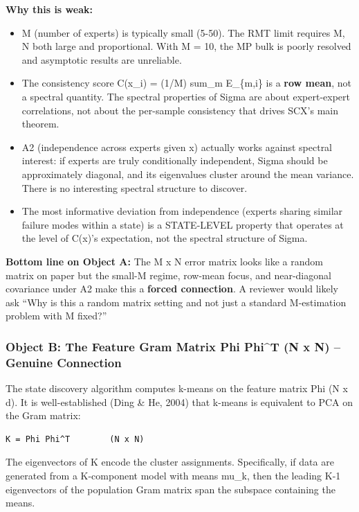 \documentclass[
  12pt,
]{article}
\providecommand{\tightlist}{%
  \setlength{\itemsep}{0pt}\setlength{\parskip}{0pt}}
\begin{document}
\textbf{Why this is weak:}

\begin{itemize}
\tightlist
\item
  M (number of experts) is typically small (5-50). The RMT limit
  requires M, N both large and proportional. With M = 10, the MP bulk is
  poorly resolved and asymptotic results are unreliable.
\item
  The consistency score C(x\_i) = (1/M) sum\_m E\_\{m,i\} is a
  \textbf{row mean}, not a spectral quantity. The spectral properties of
  Sigma are about expert-expert correlations, not about the per-sample
  consistency that drives SCX's main theorem.
\item
  A2 (independence across experts given x) actually works against
  spectral interest: if experts are truly conditionally independent,
  Sigma should be approximately diagonal, and its eigenvalues cluster
  around the mean variance. There is no interesting spectral structure
  to discover.
\item
  The most informative deviation from independence (experts sharing
  similar failure modes within a state) is a STATE-LEVEL property that
  operates at the level of C(x)'s expectation, not the spectral
  structure of Sigma.
\end{itemize}

\textbf{Bottom line on Object A:} The M x N error matrix looks like a
random matrix on paper but the small-M regime, row-mean focus, and
near-diagonal covariance under A2 make this a \textbf{forced
connection}. A reviewer would likely ask ``Why is this a random matrix
setting and not just a standard M-estimation problem with M fixed?''

\subsubsection{Object B: The Feature Gram Matrix Phi Phi\^{}T (N x N) --
Genuine
Connection}\label{object-b-the-feature-gram-matrix-phi-phit-n-x-n-genuine-connection}

The state discovery algorithm computes k-means on the feature matrix Phi
(N x d). It is well-established (Ding \& He, 2004) that k-means is
equivalent to PCA on the Gram matrix:

\begin{verbatim}
K = Phi Phi^T        (N x N)
\end{verbatim}

The eigenvectors of K encode the cluster assignments. Specifically, if
data are generated from a K-component model with means mu\_k, then the
leading K-1 eigenvectors of the population Gram matrix span the subspace
containing the means.
\end{document}
